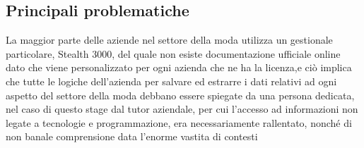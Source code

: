 \subsection{Principali problematiche}
La maggior parte delle aziende nel settore della moda utilizza un gestionale particolare, Stealth 3000, del quale non esiste documentazione ufficiale online dato che viene personalizzato per ogni azienda che ne ha la licenza,e ciò implica che tutte le logiche dell'azienda per salvare ed estrarre i dati relativi ad ogni aspetto del settore della moda debbano essere spiegate da una persona dedicata, nel caso di questo stage dal tutor aziendale, per cui l'accesso ad informazioni non legate a tecnologie e programmazione, era necessariamente rallentato, nonché di non banale comprensione data l'enorme vastita di contesti